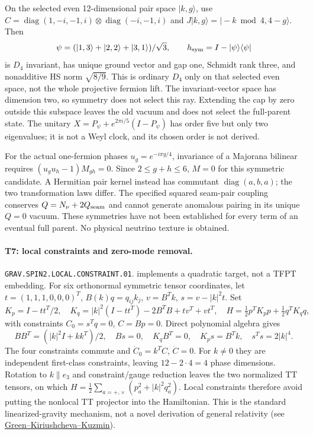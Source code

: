 On the selected even 12-dimensional pair space $|k,g\rangle$, use
$C=\operatorname{diag}(1,-i,-1,i)\otimes\operatorname{diag}(-i,-1,i)$
and $J|k,g\rangle=|-k\bmod4,4-g\rangle$. Then
\[
 \psi=(|1,3\rangle+|2,2\rangle+|3,1\rangle)/\sqrt3,\qquad
 h_{\rm sym}=I-|\psi\rangle\langle\psi|
\]
is $D_4$ invariant, has unique ground vector and gap one, Schmidt rank
three, and nonadditive HS norm $\sqrt{8/9}$. This is ordinary $D_4$ only
on that selected even space, not the whole projective fermion lift.
The invariant-vector space has dimension two, so symmetry does not
select this ray. Extending the cap by zero outside this subspace leaves
the old vacuum and does not select the full-parent state. The unitary
$X=P_\psi+e^{2\pi i/5}(I-P_\psi)$ has order five but only two eigenvalues;
it is not a Weyl clock, and its chosen order is not derived.

For the actual one-fermion phases $u_g=e^{-i\pi g/4}$, invariance of a
Majorana bilinear requires $(u_gu_h-1)M_{gh}=0$. Since $2\le g+h\le6$,
$M=0$ for this symmetric candidate. A Hermitian pair kernel instead has
commutant $\operatorname{diag}(a,b,a)$; the two transformation laws differ.
The specified squared seam-pair coupling conserves
$Q=N_\nu+2Q_{\rm seam}$ and cannot generate anomalous pairing in its
unique $Q=0$ vacuum. These symmetries have not been established for every
term of an eventual full parent. No physical neutrino texture is obtained.

\paragraph{T7: local constraints and zero-mode removal.}
\texttt{GRAV.SPIN2.LOCAL.CONSTRAINT.01}.
implements a quadratic target, not a TFPT embedding. For six orthonormal
symmetric tensor coordinates, let $t=(1,1,1,0,0,0)^T$, $B(k)q=q_{ij}k_j$,
$v=B^Tk$, $s=v-|k|^2t$. Set
\[
 K_p=I-tt^T/2,\quad
 K_q=|k|^2(I-tt^T)-2B^TB+tv^T+vt^T,\quad
 H=\tfrac12p^TK_pp+\tfrac12q^TK_qq,
\]
with constraints $C_0=s^Tq=0$, $C=Bp=0$. Direct polynomial algebra gives
\[
 BB^T=(|k|^2I+kk^T)/2,\quad Bs=0,\quad K_qB^T=0,\quad
 K_ps=B^Tk,\quad s^Ts=2|k|^4.
\]
The four constraints commute and $\dot C_0=k^TC$, $\dot C=0$.
For $k\ne0$ they are independent first-class constraints, leaving
$12-2\cdot4=4$ phase dimensions. Rotation to $k\parallel e_3$ and
constraint/gauge reduction leaves the two normalized TT tensors, on which
$H=\frac12\sum_{a=+,\times}(p_a^2+|k|^2q_a^2)$.
Local constraints therefore avoid putting the nonlocal TT projector into
the Hamiltonian. This is the standard linearized-gravity mechanism, not
a novel derivation of general relativity (see
\href{https://arxiv.org/abs/0710.1430}{Green--Kiriushcheva--Kuzmin}).

